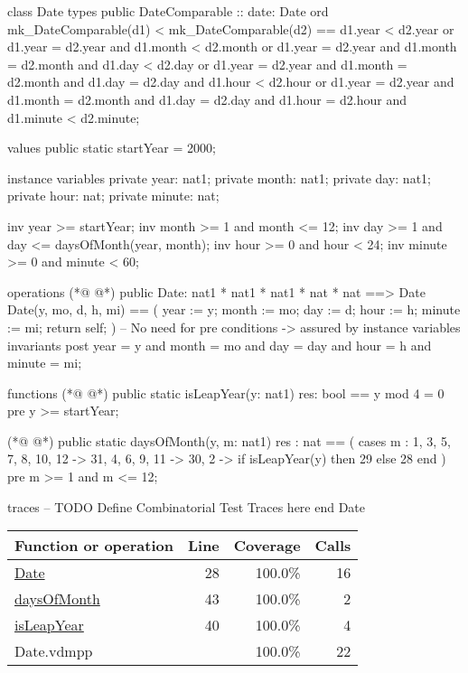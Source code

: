 \begin{vdmpp}[breaklines=true]
class Date
types
 public DateComparable :: date: Date
 ord mk_DateComparable(d1) < mk_DateComparable(d2) ==
  d1.year < d2.year or
  d1.year = d2.year and d1.month < d2.month or
  d1.year = d2.year and d1.month = d2.month and d1.day < d2.day or
  d1.year = d2.year and d1.month = d2.month and d1.day = d2.day and d1.hour < d2.hour or
  d1.year = d2.year and d1.month = d2.month and d1.day = d2.day and d1.hour = d2.hour and d1.minute < d2.minute;

values
 public static startYear = 2000;

instance variables
 private year: nat1;
 private month: nat1;
 private day: nat1;
 private hour: nat;
 private minute: nat;
 
 inv year >= startYear;
 inv month >= 1 and month <= 12;
 inv day >= 1 and day <= daysOfMonth(year, month);
 inv hour >= 0 and hour < 24;
 inv minute >= 0 and minute < 60;
 
operations
(*@
\label{Date:28}
@*)
 public Date: nat1 * nat1 * nat1 * nat * nat ==> Date
 Date(y, mo, d, h, mi) == (
  year := y;
  month := mo;
  day := d;
  hour := h;
  minute := mi;
  return self;
 ) -- No need for pre conditions -> assured by instance variables invariants
 post year = y and month = mo and day = day and hour = h and minute = mi;

functions
(*@
\label{isLeapYear:40}
@*)
 public static isLeapYear(y: nat1) res: bool == y mod 4 = 0
 pre y >= startYear;

(*@
\label{daysOfMonth:43}
@*)
 public static daysOfMonth(y, m: nat1) res : nat == (
  cases m :
   1, 3, 5, 7, 8, 10, 12 -> 31,
   4, 6, 9, 11 -> 30,
   2 -> if isLeapYear(y) then 29 else 28
  end
 )
 pre m >= 1 and m <= 12;

traces
-- TODO Define Combinatorial Test Traces here
end Date
\end{vdmpp}
\bigskip
\begin{longtable}{|l|r|r|r|}
\hline
Function or operation & Line & Coverage & Calls \\
\hline
\hline
\hyperref[Date:28]{Date} & 28&100.0\% & 16 \\
\hline
\hyperref[daysOfMonth:43]{daysOfMonth} & 43&100.0\% & 2 \\
\hline
\hyperref[isLeapYear:40]{isLeapYear} & 40&100.0\% & 4 \\
\hline
\hline
Date.vdmpp & & 100.0\% & 22 \\
\hline
\end{longtable}

